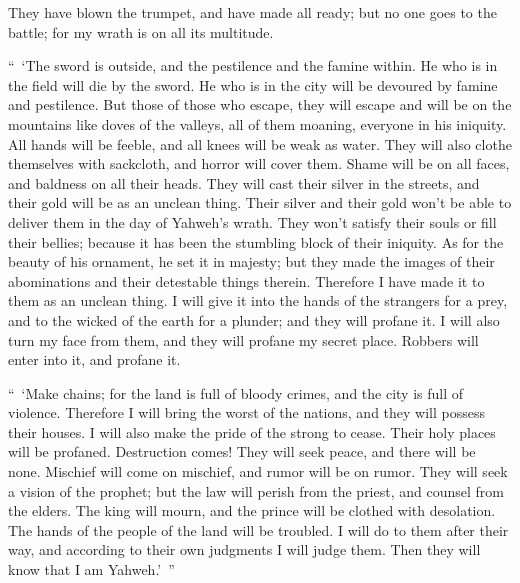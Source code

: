 {They have blown the trumpet, and have made all ready; but no one goes to the battle; for my wrath is on all its multitude.
\par }{\PP {}“ ‘The sword is outside, and the pestilence and the famine within. He who is in the field will die by the sword. He who is in the city will be devoured by famine and pestilence.
But those of those who escape, they will escape and will be on the mountains like doves of the valleys, all of them moaning, everyone in his iniquity.
All hands will be feeble, and all knees will be weak as water.
They will also clothe themselves with sackcloth, and horror will cover them. Shame will be on all faces, and baldness on all their heads.
They will cast their silver in the streets, and their gold will be as an unclean thing. Their silver and their gold won’t be able to deliver them in the day of Yahweh’s wrath. They won’t satisfy their souls or fill their bellies; because it has been the stumbling block of their iniquity.
As for the beauty of his ornament, he set it in majesty; but they made the images of their abominations and their detestable things therein. Therefore I have made it to them as an unclean thing.
I will give it into the hands of the strangers for a prey, and to the wicked of the earth for a plunder; and they will profane it.
I will also turn my face from them, and they will profane my secret place. Robbers will enter into it, and profane it.
\par }{\PP {}“ ‘Make chains; for the land is full of bloody crimes, and the city is full of violence.
Therefore I will bring the worst of the nations, and they will possess their houses. I will also make the pride of the strong to cease. Their holy places will be profaned.
Destruction comes! They will seek peace, and there will be none.
Mischief will come on mischief, and rumor will be on rumor. They will seek a vision of the prophet; but the law will perish from the priest, and counsel from the elders.
The king will mourn, and the prince will be clothed with desolation. The hands of the people of the land will be troubled. I will do to them after their way, and according to their own judgments I will judge them. Then they will know that I am Yahweh.’ ”

}
